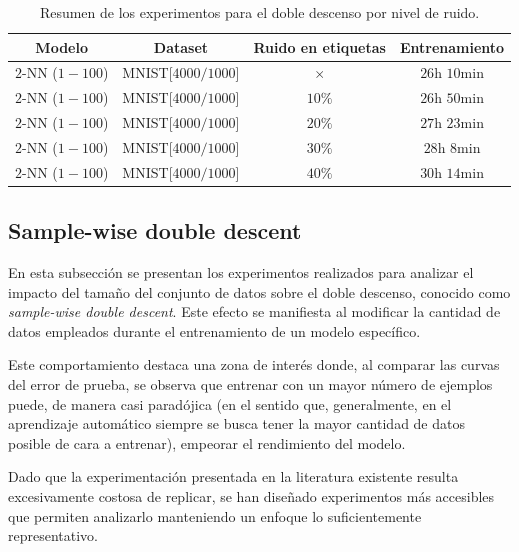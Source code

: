 \begin{table}[h!]
    \centering
    \begin{tabular}{|c|c|c|c|}
    \hline
    \textbf{Modelo}       & \textbf{Dataset} & \textbf{Ruido en etiquetas} & \textbf{Entrenamiento} \\ 
    \hline
    $2$-NN ($1-100$)          & MNIST[$4000/1000$]        & $\times$         & $26$h $10$min       \\ 
    $2$-NN ($1-100$)          & MNIST[$4000/1000$]        & $10\%$         & $26$h $50$min       \\ 
    $2$-NN ($1-100$)          & MNIST[$4000/1000$]        & $20\%$         & $27$h $23$min       \\ 
    $2$-NN ($1-100$)          & MNIST[$4000/1000$]        & $30\%$          & $28$h $8$min       \\ 
    $2$-NN ($1-100$)          & MNIST[$4000/1000$]       & $40\%$          & $30$h $14$min       \\  
    \hline
    \end{tabular}
    \caption[Resumen de los experimentos para el doble descenso por nivel de ruido.]{Resumen de los experimentos para el doble descenso por nivel de ruido.}
    \label{tab:noisewisedd}
    \end{table}

\subsection{Sample-wise double descent}\label{subsec:sample-wise-dd}

En esta subsección se presentan los experimentos realizados para analizar el impacto del tamaño del conjunto de datos sobre el doble descenso, conocido como \textit{sample-wise double descent}. Este efecto se manifiesta al modificar la cantidad de datos empleados durante el entrenamiento de un modelo específico.\newline

Este comportamiento destaca una zona de interés donde, al comparar las curvas del error de prueba, se observa que entrenar con un mayor número de ejemplos puede, de manera casi paradójica (en el sentido que, generalmente, en el aprendizaje automático siempre se busca tener la mayor cantidad de datos posible de cara a entrenar), empeorar el rendimiento del modelo.\newline

Dado que la experimentación presentada en la literatura existente resulta excesivamente costosa de replicar, se han diseñado experimentos más accesibles que permiten analizarlo manteniendo un enfoque lo suficientemente representativo.\newline


